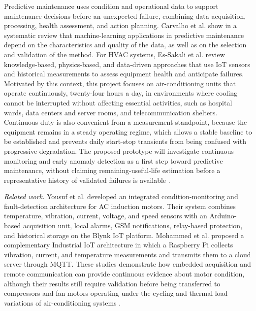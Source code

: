 \documentclass[english,hidelinks]{sbrt}
\begin{document}
Predictive maintenance uses condition and operational data to support maintenance decisions before an unexpected failure, combining data acquisition, processing, health assessment, and action planning. Carvalho et al. show in a systematic review that machine-learning applications in predictive maintenance depend on the characteristics and quality of the data, as well as on the selection and validation of the method. For HVAC systems, Es-Sakali et al. review knowledge-based, physics-based, and data-driven approaches that use IoT sensors and historical measurements to assess equipment health and anticipate failures. Motivated by this context, this project focuses on air-conditioning units that operate continuously, twenty-four hours a day, in environments where cooling cannot be interrupted without affecting essential activities, such as hospital wards, data centers and server rooms, and telecommunication shelters. Continuous duty is also convenient from a measurement standpoint, because the equipment remains in a steady operating regime, which allows a stable baseline to be established and prevents daily start-stop transients from being confused with progressive degradation. The proposed prototype will investigate continuous monitoring and early anomaly detection as a first step toward predictive maintenance, without claiming remaining-useful-life estimation before a representative history of validated failures is available \cite{carvalho2019mlpdm,essakali2022hvac}.

\textit{Related work.} Yousuf et al. developed an integrated condition-monitoring and fault-detection architecture for AC induction motors. Their system combines temperature, vibration, current, voltage, and speed sensors with an Arduino-based acquisition unit, local alarms, GSM notifications, relay-based protection, and historical storage on the Blynk IoT platform. Mohammed et al. proposed a complementary Industrial IoT architecture in which a Raspberry Pi collects vibration, current, and temperature measurements and transmits them to a cloud server through MQTT. These studies demonstrate how embedded acquisition and remote communication can provide continuous evidence about motor condition, although their results still require validation before being transferred to compressors and fan motors operating under the cycling and thermal-load variations of air-conditioning systems \cite{yousuf2024iot,mohammed2023iot}.
\end{document}

